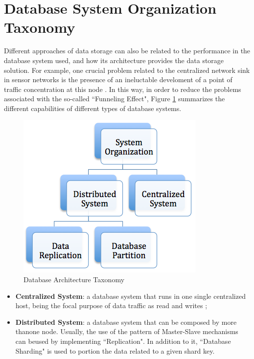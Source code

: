 \section{Database System Organization Taxonomy}

Different approaches of data storage can also be related to the performance in
the database system used, and how its architecture provides the data storage
solution. For example, one crucial problem related to the centralized network
sink in sensor networks is the presence of an ineluctable develoment of a point
of traffic concentration at this node \cite{sn-storage02}. In this way, in
order to reduce the problems associated with the so-called ``Funneling Effect",
Figure \ref{fig:taxonomy-database-architecture} summarizes the different
capabilities of different types of database systems.

\begin{figure}[h]
  \centering
  \includegraphics{../diagrams/taxonomy-database-architecture}
  \caption{Database Architecture Taxonomy}
  \label{fig:taxonomy-database-architecture}
\end{figure}

\begin{itemize}
  \item \textbf{Centralized System}: a database system that runs in one single
  centralized host, being the focal purpose of data traffic as read and writes 
  \cite{sn-intro01};
  \item \textbf{Distributed System}: a database system that can be composed by
  more thanone node. Usually, the use of the pattern of Master-Slave
  mechanisms can beused by implementing ``Replication". In addition to it,
  ``Database Sharding" is used to portion the data related to a given shard key.
\end{itemize}